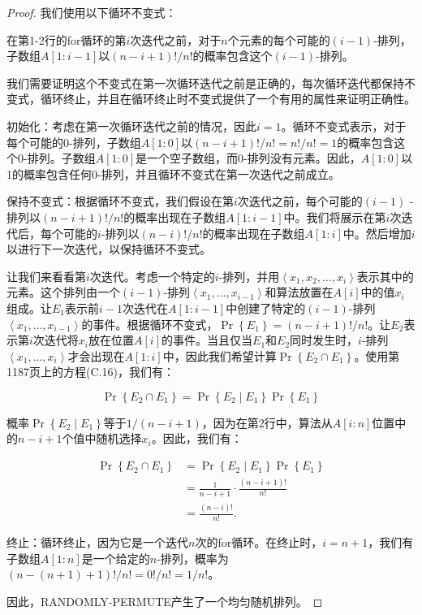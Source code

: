 \documentclass[lang=cn,newtx,10pt,scheme=chinese]{elegantbook}
\begin{document}
\begin{proof}
我们使用以下循环不变式：

在第1-2行的for循环的第$i$次迭代之前，对于$n$个元素的每个可能的$(i-1)$-排列，子数组$A[1:i-1]$以$(n-i+1)!/n!$的概率包含这个$(i-1)$-排列。

我们需要证明这个不变式在第一次循环迭代之前是正确的，每次循环迭代都保持不变式，循环终止，并且在循环终止时不变式提供了一个有用的属性来证明正确性。

初始化：考虑在第一次循环迭代之前的情况，因此$i=1$。循环不变式表示，对于每个可能的0-排列，子数组$A[1:0]$以$(n-i+1)!/n!=n!/n!=1$的概率包含这个0-排列。子数组$A[1:0]$是一个空子数组，而0-排列没有元素。因此，$A[1:0]$以1的概率包含任何0-排列，并且循环不变式在第一次迭代之前成立。

保持不变式：根据循环不变式，我们假设在第$i$次迭代之前，每个可能的$(i-1)$ -排列以$(n-i+1)!/n!$的概率出现在子数组$A[1:i-1]$中。我们将展示在第$i$次迭代后，每个可能的$i$-排列以$(n-i)!/n!$的概率出现在子数组$A[1:i]$中。然后增加$i$以进行下一次迭代，以保持循环不变式。

让我们来看看第$i$次迭代。考虑一个特定的$i$-排列，并用$\left\langle x_1,x_2,\ldots,x_i\right\rangle$表示其中的元素。这个排列由一个$(i-1)$-排列$\left\langle x_1,\ldots,x_{i-1}\right\rangle$和算法放置在$A[i]$中的值$x_i$组成。让$E_1$表示前$i-1$次迭代在$A[1:i-1]$中创建了特定的$(i-1)$-排列$\left\langle x_1,\ldots,x_{i-1}\right\rangle$的事件。根据循环不变式，$\operatorname{Pr}\left\{E_1\right\}=(n-i+1)!/n!$。让$E_2$表示第$i$次迭代将$x_i$放在位置$A[i]$的事件。当且仅当$E_1$和$E_2$同时发生时，$i$-排列$\left\langle x_1,\ldots,x_i\right\rangle$才会出现在$A[1:i]$中，因此我们希望计算$\operatorname{Pr}\left\{E_2 \cap E_1\right\}$。使用第1187页上的方程(C.16)，我们有：

$$
\operatorname{Pr}\left\{E_2 \cap E_1\right\}=\operatorname{Pr}\left\{E_2 \mid E_1\right\} \operatorname{Pr}\left\{E_1\right\}
$$

概率$\operatorname{Pr}\left\{E_2 \mid E_1\right\}$等于$1/(n-i+1)$，因为在第2行中，算法从$A[i:n]$位置中的$n-i+1$个值中随机选择$x_i$。因此，我们有：

$$
\begin{aligned}
\operatorname{Pr}\left\{E_2 \cap E_1\right\} & =\operatorname{Pr}\left\{E_2 \mid E_1\right\} \operatorname{Pr}\left\{E_1\right\} \\
& =\frac{1}{n-i+1} \cdot \frac{(n-i+1) !}{n !} \\
& =\frac{(n-i) !}{n !} .
\end{aligned}
$$

终止：循环终止，因为它是一个迭代$n$次的for循环。在终止时，$i=n+1$，我们有子数组$A[1:n]$是一个给定的$n$-排列，概率为$(n-(n+1)+1)!/n!=0!/n!=1/n!$。

因此，RANDOMLY-PERMUTE产生了一个均匀随机排列。
\end{proof}
\end{document}
